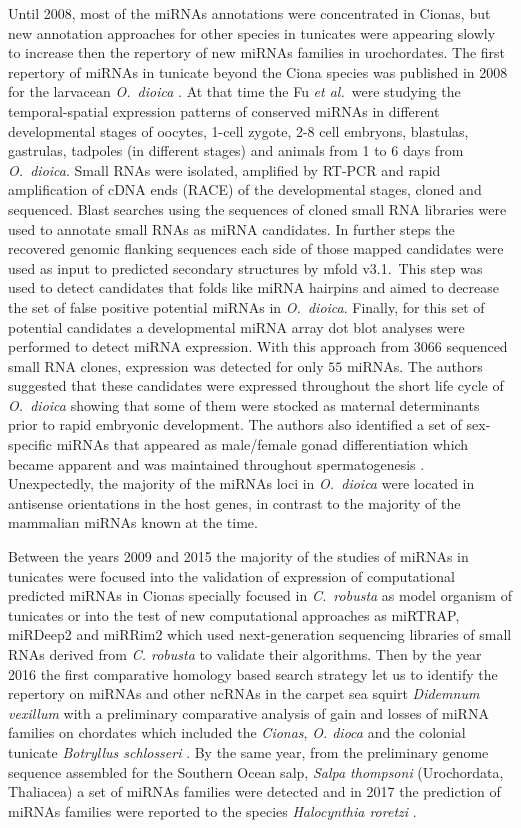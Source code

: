 \documentclass[graybox]{svmult}
\begin{document}
Until 2008, most of the miRNAs annotations were concentrated in Cionas, but
new annotation approaches for other species in tunicates were appearing
slowly to increase then the repertory of new miRNAs families in
urochordates. The first repertory of miRNAs in tunicate beyond the Ciona
species was published in 2008 for the larvacean \textit{O.\ dioica}
\cite{Fu:08}. At that time the Fu \emph{et al.}\ were studying the
temporal-spatial expression patterns of conserved miRNAs in different
developmental stages of oocytes, 1-cell zygote, 2-8 cell embryons,
blastulas, gastrulas, tadpoles (in different stages) and animals from 1 to
6 days from \textit{O.\ dioica}. Small RNAs were isolated, amplified by
RT-PCR and rapid amplification of cDNA ends (RACE) of the developmental
stages, cloned and sequenced. Blast searches using the sequences of cloned
small RNA libraries were used to annotate small RNAs as miRNA
candidates. In further steps the recovered genomic flanking sequences each
side of those mapped candidates were used as input to predicted secondary
structures by mfold v3.1.\ This step was used to detect candidates that
folds like miRNA hairpins and aimed to decrease the set of false positive
potential miRNAs in \textit{O.\ dioica}. Finally, for this set of potential
candidates a developmental miRNA array dot blot analyses were performed to
detect miRNA expression. With this approach from $3066$ sequenced small RNA
clones, expression was detected for only $55$ miRNAs.  The authors
suggested that these candidates were expressed throughout the short life
cycle of \textit{O.\ dioica} showing that some of them were stocked as
maternal determinants prior to rapid embryonic development. The authors
also identified a set of sex-specific miRNAs that appeared as male/female
gonad differentiation which became apparent and was maintained throughout
spermatogenesis \cite{Fu:08}. Unexpectedly, the majority of the miRNAs
loci in \textit{O.\ dioica} were located in antisense orientations in the
host genes, in contrast to the majority of the mammalian miRNAs known at
the time.

Between the years 2009 and 2015 the majority of the studies of miRNAs in
tunicates were focused into the validation of expression of computational
predicted miRNAs in Cionas specially focused in \textit{C.\ robusta} as
model organism of tunicates or into the test of new computational
approaches as miRTRAP, miRDeep2 and miRRim2 which used next-generation
sequencing libraries of small RNAs derived from \textit{C. robusta} to
validate their algorithms.  Then by the year 2016 the first comparative
homology based search strategy let us to identify the repertory on miRNAs
and other ncRNAs in the carpet sea squirt \textit{Didemnum vexillum} with a
preliminary comparative analysis of gain and losses of miRNA families on
chordates which included the \textit{Cionas}, \textit{O. dioca} and the
colonial tunicate \textit{Botryllus schlosseri}
\cite{Velandia-Huerto2016}. By the same year, from the preliminary genome
sequence assembled for the Southern Ocean salp, \textit{Salpa thompsoni}
(Urochordata, Thaliacea) a set of miRNAs families were detected
\cite{Jue2016} and in 2017 the prediction of miRNAs families were reported
to the species \textit{Halocynthia roretzi} \cite{Wang2017}.
\end{document}
